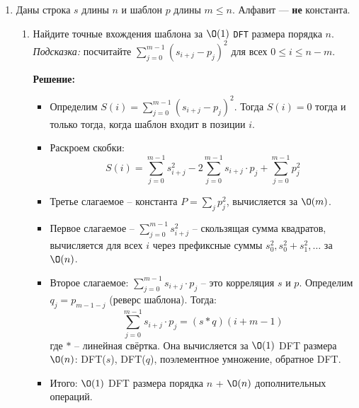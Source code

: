 \begin{enumerate}
\begin{itemize}
      \item Оценим суммарную стоимость. Так как $N(d-1) = 2^d - 1$:
      $$\sum_{d=1}^{h} \O(N(d-1) \log N(d-1)) = \sum_{d=1}^{h} \O(2^d \cdot d)$$

      Используем $\sum_{d=1}^{h} d \cdot 2^d = (h - 1) \cdot 2^{h+1} + 2 = \O(h \cdot 2^h) = \O(h \cdot N(h))$.

      \item Итого: $\O(h \cdot N(h))$.
    \end{itemize}

  \item
    Даны строка $s$ длины $n$ и шаблон $p$ длины $m \le n$.
    Алфавит --- \textbf{не} константа.
    \begin{enumerate}
      \item
        Найдите точные вхождения шаблона за $\O(1)$ \texttt{DFT} размера порядка $n$. \\
        \textit{Подсказка: } посчитайте $\sum_{j = 0}^{m - 1} (s_{i+j} - p_j)^2$ для всех $0 \le i \le n - m$.

        \textbf{Решение:}

        \begin{itemize}
          \item Определим $S(i) = \sum_{j=0}^{m-1}(s_{i+j} - p_j)^2$. Тогда $S(i) = 0$ тогда и только тогда, когда шаблон входит в позиции $i$.

          \item Раскроем скобки:
          $$S(i) = \sum_{j=0}^{m-1} s_{i+j}^2 - 2\sum_{j=0}^{m-1} s_{i+j} \cdot p_j + \sum_{j=0}^{m-1} p_j^2$$

          \item Третье слагаемое -- константа $P = \sum_{j} p_j^2$, вычисляется за $\O(m)$.

          \item Первое слагаемое -- $\sum_{j=0}^{m-1} s_{i+j}^2$ -- скользящая сумма квадратов, вычисляется для всех $i$ через префиксные суммы $s_0^2, s_0^2 + s_1^2, \ldots$ за $\O(n)$.

          \item Второе слагаемое: $\sum_{j=0}^{m-1} s_{i+j} \cdot p_j$ -- это корреляция $s$ и $p$. Определим $q_j = p_{m-1-j}$ (реверс шаблона). Тогда:
          $$\sum_{j=0}^{m-1} s_{i+j} \cdot p_j = (s * q)(i + m - 1)$$
          где $*$ -- линейная свёртка. Она вычисляется за $\O(1)$ DFT размера $\O(n)$: DFT($s$), DFT($q$), поэлементное умножение, обратное DFT.

          \item Итого: $\O(1)$ DFT размера порядка $n$ + $\O(n)$ дополнительных операций.
        \end{itemize}


\end{enumerate}
\end{enumerate}
